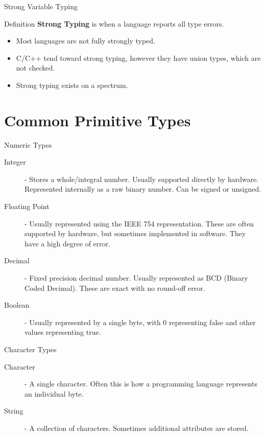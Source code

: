 \documentclass[handout]{beamer}
\begin{document}
\begin{frame}{Strong Variable Typing}
\begin{block}{Definition}
\textbf{Strong Typing} is when a language reports all type errors.
\end{block}
\begin{itemize}
    \item Most languages are not fully strongly typed.
    \item C/C++ tend toward strong typing, however they have union types, which are not checked.
    \item Strong typing exists on a spectrum.
\end{itemize}
\end{frame}

\section{Common Primitive Types}
\begin{frame}{Numeric Types}
    \begin{description}
        \item[Integer] - Stores a whole/integral number. Usually supported directly by hardware. Represented internally as a raw binary number. Can be signed or unsigned.
        \item[Floating Point] - Usually represented using the IEEE 754 representation. These are often supported by hardware, but sometimes implemented in software. They have a high degree of error.
        \item[Decimal] - Fixed precision decimal number. Usually represented as BCD (Binary Coded Decimal). These are exact with no round-off error.
        \item[Boolean] - Usually represented by a single byte, with 0 representing false and other values representing true.
    \end{description}
\end{frame}

\begin{frame}{Character Types}
    \begin{description}
        \item[Character] - A single character. Often this is how a programming language represents an individual byte.
        \item[String] - A collection of characters. Sometimes additional attributes are stored.
    \end{description}
\end{frame}
\end{document}
